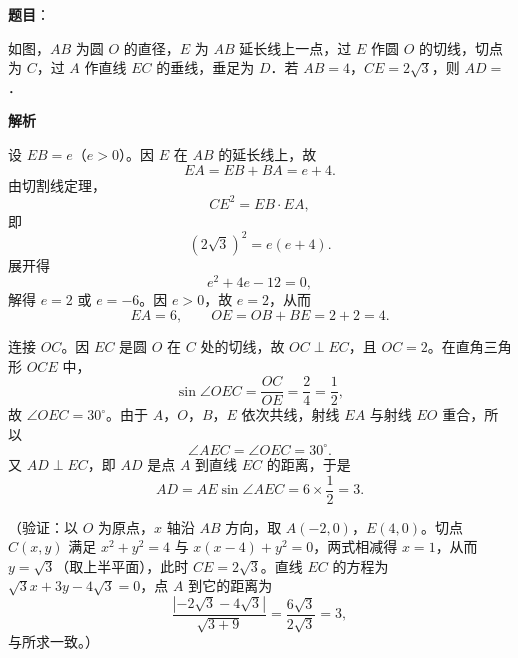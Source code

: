 \begin{answer}

\textbf{题目}：

如图，\(AB\) 为圆 \(O\) 的直径，\(E\) 为 \(AB\) 延长线上一点，过 \(E\) 作圆 \(O\) 的切线，切点为 \(C\)，过 \(A\) 作直线 \(EC\) 的垂线，垂足为 \(D\)．若 \(AB=4\)，\(CE=2\sqrt{3}\)，则 \(AD=\)\gkblank{}．
\nopagebreak[4]
\begin{center}\end{center}
\nopagebreak[4]
\textbf{解析}

设 \(EB=e\)（\(e>0\)）。因 \(E\) 在 \(AB\) 的延长线上，故
\nopagebreak[4]
\[
EA=EB+BA=e+4.
\]
由切割线定理，
\nopagebreak[4]
\[
CE^2=EB\cdot EA,
\]
即
\nopagebreak[4]
\[
(2\sqrt3)^2=e(e+4).
\]
展开得
\nopagebreak[4]
\[
e^2+4e-12=0,
\]
解得 \(e=2\) 或 \(e=-6\)。因 \(e>0\)，故 \(e=2\)，从而
\nopagebreak[4]
\[
EA=6,\qquad OE=OB+BE=2+2=4.
\]

连接 \(OC\)。因 \(EC\) 是圆 \(O\) 在 \(C\) 处的切线，故 \(OC\perp EC\)，且 \(OC=2\)。在直角三角形 \(OCE\) 中，
\nopagebreak[4]
\[
\sin\angle OEC=\dfrac{OC}{OE}=\dfrac{2}{4}=\dfrac12,
\]
故 \(\angle OEC=30^\circ\)。由于 \(A\)，\(O\)，\(B\)，\(E\) 依次共线，射线 \(EA\) 与射线 \(EO\) 重合，所以
\nopagebreak[4]
\[
\angle AEC=\angle OEC=30^\circ.
\]
又 \(AD\perp EC\)，即 \(AD\) 是点 \(A\) 到直线 \(EC\) 的距离，于是
\nopagebreak[4]
\[
AD=AE\sin\angle AEC=6\times\dfrac12=3.
\]

（验证：以 \(O\) 为原点，\(x\) 轴沿 \(AB\) 方向，取 \(A(-2,0)\)，\(E(4,0)\)。切点 \(C(x,y)\) 满足 \(x^2+y^2=4\) 与 \(x(x-4)+y^2=0\)，两式相减得 \(x=1\)，从而 \(y=\sqrt3\)（取上半平面），此时 \(CE=2\sqrt3\)。直线 \(EC\) 的方程为 \(\sqrt3x+3y-4\sqrt3=0\)，点 \(A\) 到它的距离为
\nopagebreak[4]
\[
\dfrac{|-2\sqrt3-4\sqrt3|}{\sqrt{3+9}}=\dfrac{6\sqrt3}{2\sqrt3}=3,
\]
与所求一致。）


\end{answer}
